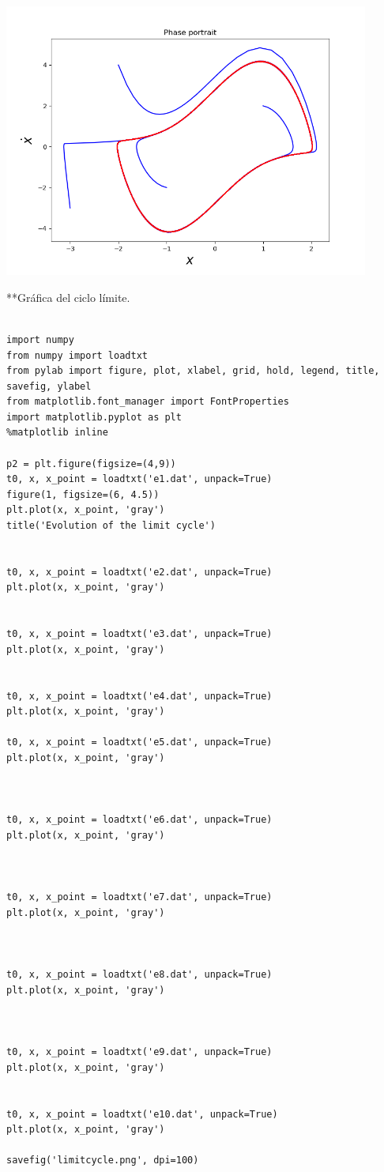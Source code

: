 \documentclass{article} %
\begin{document}
\begin{center}
	\includegraphics[width=12cm]{phportrait.png}
\end{center}

**Gráfica del ciclo límite.

\begin{verbatim} 

import numpy
from numpy import loadtxt
from pylab import figure, plot, xlabel, grid, hold, legend, title, savefig, ylabel
from matplotlib.font_manager import FontProperties
import matplotlib.pyplot as plt
%matplotlib inline

p2 = plt.figure(figsize=(4,9))
t0, x, x_point = loadtxt('e1.dat', unpack=True)
figure(1, figsize=(6, 4.5))
plt.plot(x, x_point, 'gray')
title('Evolution of the limit cycle')


t0, x, x_point = loadtxt('e2.dat', unpack=True)
plt.plot(x, x_point, 'gray')


t0, x, x_point = loadtxt('e3.dat', unpack=True)
plt.plot(x, x_point, 'gray')


t0, x, x_point = loadtxt('e4.dat', unpack=True)
plt.plot(x, x_point, 'gray')

t0, x, x_point = loadtxt('e5.dat', unpack=True)
plt.plot(x, x_point, 'gray')



t0, x, x_point = loadtxt('e6.dat', unpack=True)
plt.plot(x, x_point, 'gray')



t0, x, x_point = loadtxt('e7.dat', unpack=True)
plt.plot(x, x_point, 'gray')



t0, x, x_point = loadtxt('e8.dat', unpack=True)
plt.plot(x, x_point, 'gray')



t0, x, x_point = loadtxt('e9.dat', unpack=True)
plt.plot(x, x_point, 'gray')


t0, x, x_point = loadtxt('e10.dat', unpack=True)
plt.plot(x, x_point, 'gray')

savefig('limitcycle.png', dpi=100)

\end{verbatim}
\end{document}
